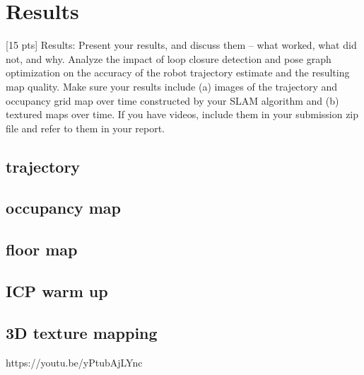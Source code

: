 \documentclass[conference]{IEEEtran}
\begin{document}
\section{Results}
[15 pts] Results: Present your results, and discuss them – what worked, what did not, and why.
Analyze the impact of loop closure detection and pose graph optimization on the accuracy of the robot
trajectory estimate and the resulting map quality. Make sure your results include (a) images of the
trajectory and occupancy grid map over time constructed by your SLAM algorithm and (b) textured
maps over time. If you have videos, include them in your submission zip file and refer to them in your
report.


\subsection{trajectory}

\subsection{occupancy map}

\subsection{floor map}

\appendix
\subsection{ICP warm up}

\subsection{3D texture mapping}
https://youtu.be/yPtubAjLYnc
\end{document}

